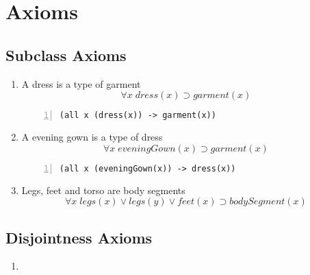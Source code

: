 \documentclass[paper=a4, fontsize=11pt]{scrartcl} %
\numberwithin{equation}{section} %
\numberwithin{figure}{section} %
\numberwithin{table}{section} %
\begin{document}
\section{Axioms}

\subsection{Subclass Axioms}
\begin{enumerate}

	\item A dress is a type of garment
	\begin{equation*}
		\forall x \; dress(x) \supset garment(x)
	\end{equation*}
	\begin{Verbatim}[frame=lines,gobble=2,numbers=left]
		(all x (dress(x)) -> garment(x))
	\end{Verbatim}
	

	\item A evening gown is a type of dress
	\begin{equation*}
		\forall x \; eveningGown(x) \supset garment(x)
	\end{equation*}
	\begin{Verbatim}[frame=lines,gobble=2,numbers=left]
		(all x (eveningGown(x)) -> dress(x))
	\end{Verbatim}


\item Legs, feet and torso are body segments
\begin{equation*}
	\forall x \; legs(x) \lor legs(y) \lor feet(x) \supset bodySegment(x)
\end{equation*}

\end{enumerate}
\clearpage

\subsection{Disjointness Axioms}
\begin{enumerate}
	\item
\end{enumerate}
\clearpage
\end{document}

